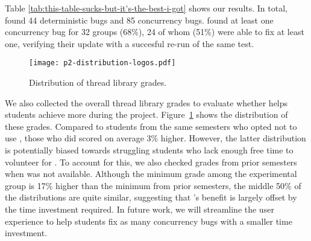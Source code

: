 Table \ref{tab:this-table-sucks-but-it's-the-best-i-got} shows our results.
In total, \landslide found 44 deterministic bugs and 85 concurrency bugs.
\landslide found at least one concurrency bug for 32 groups (68\%),
24 of whom (51\%) were able to fix at least one,
verifying their update with a succesful re-run of the same test.

\begin{figure}[t]
	\texttt{[image: p2-distribution-logos.pdf]}
	\caption{Distribution of thread library grades.}
	\label{fig:p2-distribution}
\end{figure}
We also collected the overall thread library grades to evaluate whether \landslide helps students achieve more during the project.
Figure~\ref{fig:p2-distribution} shows the distribution of these grades.
Compared to students from the same semesters who opted not to use \landslide,
those who did scored on average 3\% higher. %
%
However, the latter distribution is potentially biased towards struggling students
who lack enough free time to volunteer for \landslide.
To account for this, we also checked grades from prior semesters when \landslide was not available.
Although the minimum grade among the experimental group is 17\% higher than the minimum from prior semesters,
the middle 50\% of the distributions are quite similar,
suggesting that \landslide's benefit is largely offset by the time investment required.
%
In future work, we will streamline the user experience to help students fix as many concurrency bugs with a smaller time investment.
